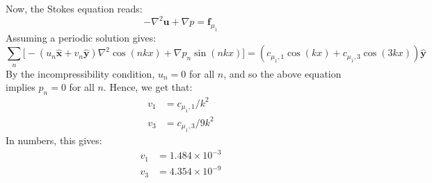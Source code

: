 \documentclass[reqno]{article}
\begin{document}
Now, the Stokes equation reads:
\begin{equation}
  -\nabla^2 \mathbf{u} + \nabla p = \mathbf{f}_{\mu_1}
\end{equation}
Assuming a periodic solution gives:
\begin{equation}
  \sum_n \biggl[
  -\left( u_n \mathbf{\hat{x}} + v_n \mathbf{\hat{y}} \right) \nabla^2 \cos(nkx)
  + \nabla p_n \sin(nkx)
  \biggr]
  =
  \left(
    c_{\mu_1, 1} \cos(kx) + c_{\mu_1, 3} \cos(3kx)
  \right) \mathbf{\hat{y}}
\end{equation}
By the incompressibility condition, $u_n = 0$ for all $n$, and so the above
equation implies $p_n = 0$ for all $n$.
Hence, we get that:
\begin{align}
  v_1 &= c_{\mu_1, 1} / k^2 \\
  v_3 &= c_{\mu_1, 3} / 9 k^2
\end{align}
In numbers, this gives:
\begin{align}
  v_1 &= 1.484 \times 10^{-3} \\
  v_3 &= 4.354 \times 10^{-9}
\end{align}
\end{document}
